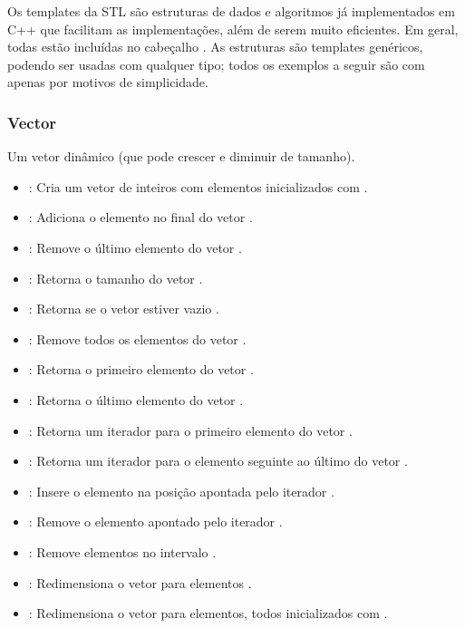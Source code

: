 Os templates da STL são estruturas de dados e algoritmos já implementados em C++ que facilitam as implementações, além de serem muito eficientes. Em geral, todas estão incluídas no cabeçalho . As estruturas são templates genéricos, podendo ser usadas com qualquer tipo; todos os exemplos a seguir são com  apenas por motivos de simplicidade.

\subsubsection{Vector}

Um vetor dinâmico (que pode crescer e diminuir de tamanho).
\begin{itemize}\setlength\itemsep{0pt}
    \item {}: Cria um vetor de inteiros com  elementos inicializados com  .
    \item {}: Adiciona o elemento  no final do vetor .
    \item {}: Remove o último elemento do vetor .
    \item {}: Retorna o tamanho do vetor .
    \item {}: Retorna  se o vetor estiver vazio .
    \item {}: Remove todos os elementos do vetor .
    \item {}: Retorna o primeiro elemento do vetor .
    \item {}: Retorna o último elemento do vetor .
    \item {}: Retorna um iterador para o primeiro elemento do vetor .
    \item {}: Retorna um iterador para o elemento seguinte ao último do vetor .
    \item {}: Insere o elemento  na posição apontada pelo iterador  .
    \item {}: Remove o elemento apontado pelo iterador  .
    \item {}: Remove elementos no intervalo \code{[it1, it2)} .
    \item {}: Redimensiona o vetor para  elementos .
    \item {}: Redimensiona o vetor para  elementos, todos inicializados com  .
\end{itemize}

